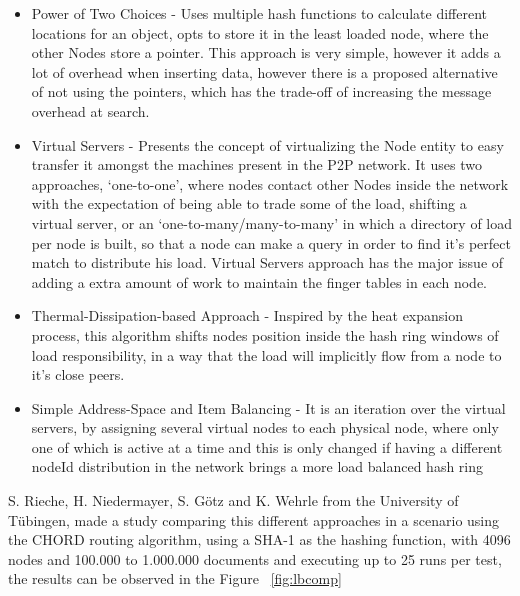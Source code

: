 \begin{itemize}
   \item Power of Two Choices\cite{Byers} - Uses multiple hash functions to calculate different locations for an object, opts to store it in the least loaded node, where the other Nodes store a pointer. This approach is very simple, however it adds a lot of overhead when inserting data, however there is a proposed alternative of not using the pointers, which has the trade-off of increasing the message overhead at search.
   \item Virtual Servers\cite{Rao2003} - Presents the concept of virtualizing the Node entity to easy transfer it amongst the machines present in the P2P network. It uses two approaches, `one-to-one', where nodes contact other Nodes inside the network with the expectation of being able to trade some of the load, shifting a virtual server, or an `one-to-many/many-to-many' in which a directory of load per node is built, so that a node can make a query in order to find it's perfect match to distribute his load. Virtual Servers approach has the major issue of adding a extra amount of work to maintain the finger tables in each node.
   \item Thermal-Dissipation-based Approach\cite{Rieche} - Inspired by the heat expansion process, this algorithm shifts nodes position inside the hash ring windows of load responsibility, in a way that the load will implicitly flow from a node to it's close peers.
   \item Simple Address-Space and Item Balancing\cite{Karger2004} - It is an iteration over the virtual servers, by assigning several virtual nodes to each physical node, where only one of which is active at a time and this is only changed if having a different nodeId distribution in the network brings a more load balanced hash ring
 \end{itemize} 

S. Rieche, H. Niedermayer, S. Götz and  K. Wehrle from the University of Tübingen, made a study comparing this different approaches in a scenario using the CHORD routing algorithm, using a SHA-1 as the hashing function, with 4096 nodes and 100.000 to 1.000.000 documents and executing up to 25 runs per test, the results can be observed in the Figure ~\ref{fig:lbcomp}


